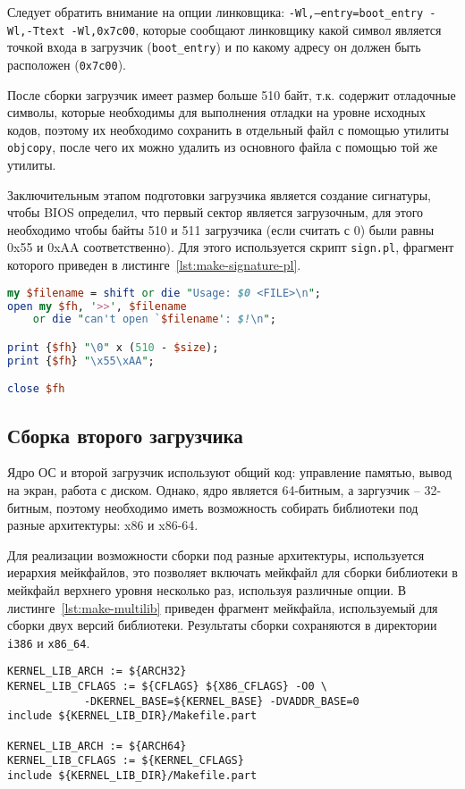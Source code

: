 Следует обратить внимание на опции линковщика: \texttt{-Wl,--entry=boot\_entry -Wl,-Ttext -Wl,0x7c00},
которые сообщают линковщику какой символ является точкой входа в загрузчик (\texttt{boot\_entry}) и по
какому адресу он должен быть расположен (\texttt{0x7c00}).

После сборки загрузчик имеет размер больше 510 байт, т.к. содержит отладочные символы, которые
необходимы для выполнения отладки на уровне исходных кодов, поэтому их необходимо сохранить
в отдельный файл с помощью утилиты \texttt{objcopy}, после чего их можно удалить из основного файла
с помощью той же утилиты.

Заключительным этапом подготовки загрузчика является создание сигнатуры, чтобы BIOS определил, что
первый сектор является загрузочным, для этого необходимо чтобы байты 510 и 511 загрузчика (если считать с 0)
были равны 0x55 и 0xAA соответственно). Для этого используется скрипт \texttt{sign.pl}, фрагмент
которого приведен в листинге~\ref{lst:make-signature-pl}.

\begin{lstlisting}[language=Perl, caption={Фрагмент скрипта для создания сигнатуры}, label={lst:make-signature-pl}]
my $filename = shift or die "Usage: $0 <FILE>\n";
open my $fh, '>>', $filename
	or die "can't open `$filename': $!\n";

print {$fh} "\0" x (510 - $size);
print {$fh} "\x55\xAA";

close $fh
\end{lstlisting}

\subsection{Сборка второго загрузчика}
Ядро ОС и второй загрузчик используют общий код: управление памятью, вывод на экран,
работа с диском. Однако, ядро является 64-битным, а заргузчик -- 32-битным, поэтому
необходимо иметь возможность собирать библиотеки под разные архитектуры: x86 и x86-64.

Для реализации возможности сборки под разные архитектуры, используется иерархия мейкфайлов,
это позволяет включать мейкфайл для сборки библиотеки в мейкфайл верхнего уровня несколько
раз, используя различные опции. В листинге~\ref{lst:make-multilib} приведен фрагмент мейкфайла, используемый
для сборки двух версий библиотеки. Результаты сборки сохраняются в директории \texttt{i386} и \texttt{x86\_64}.

\begin{lstlisting}[language=Make, caption={Фрагмент мейкфайла для сборки библиотек}, label={lst:make-multilib}]
KERNEL_LIB_ARCH := ${ARCH32}
KERNEL_LIB_CFLAGS := ${CFLAGS} ${X86_CFLAGS} -O0 \
		    -DKERNEL_BASE=${KERNEL_BASE} -DVADDR_BASE=0
include ${KERNEL_LIB_DIR}/Makefile.part

KERNEL_LIB_ARCH := ${ARCH64}
KERNEL_LIB_CFLAGS := ${KERNEL_CFLAGS}
include ${KERNEL_LIB_DIR}/Makefile.part
\end{lstlisting}

